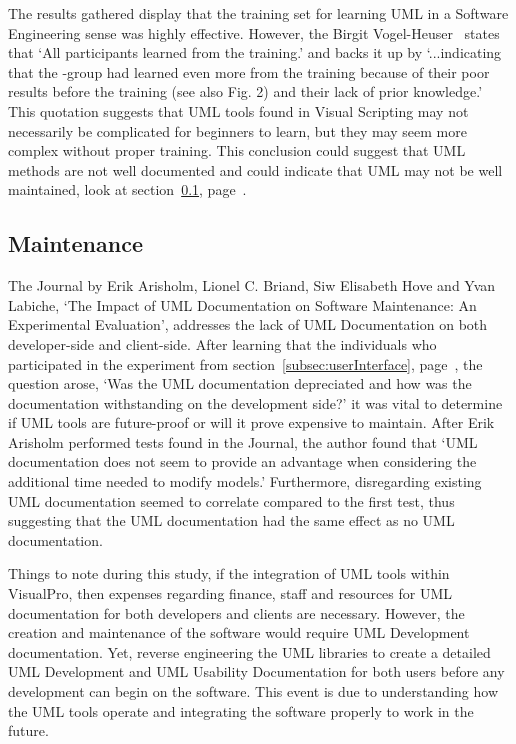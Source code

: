 \documentclass[12pt]{report} %
\begin{document}
			The results gathered display that the training set for learning UML in a Software Engineering sense was highly effective. However, the Birgit Vogel-Heuser~\cite{vogel-heuser_evaluation_2013} states that `All participants learned from the training.' and backs it up by `...indicating that the -group had learned even more from the training because of their poor results before the training (see also Fig. 2) and their lack of prior knowledge.' This quotation suggests that UML tools found in Visual Scripting may not necessarily be complicated for beginners to learn, but they may seem more complex without proper training. This conclusion could suggest that UML methods are not well documented and could indicate that UML may not be well maintained, look at section~\ref{subsec:maintenance}, page~\pageref{subsec:maintenance}.

		\subsection{Maintenance}
		\label{subsec:maintenance}
			The Journal by Erik Arisholm, Lionel C. Briand, Siw Elisabeth Hove and Yvan Labiche, `The Impact of UML Documentation on Software Maintenance: An Experimental Evaluation', addresses the lack of UML Documentation on both developer-side and client-side. After learning that the individuals who participated in the experiment from section~\ref{subsec:userInterface}, page~\pageref{subsec:userInterface}, the question arose, `Was the UML documentation depreciated and how was the documentation withstanding on the development side?' it was vital to determine if UML tools are future-proof or will it prove expensive to maintain. After Erik Arisholm performed tests found in the Journal, the author found that `UML documentation does not seem to provide an advantage when considering the additional time needed to modify models.' Furthermore, disregarding existing UML documentation seemed to correlate compared to the first test, thus suggesting that the UML documentation had the same effect as no UML documentation.

			Things to note during this study, if the integration of UML tools within VisualPro, then expenses regarding finance, staff and resources for UML documentation for both developers and clients are necessary. However, the creation and maintenance of the software would require UML Development documentation. Yet, reverse engineering the UML libraries to create a detailed UML Development and UML Usability Documentation for both users before any development can begin on the software. This event is due to understanding how the UML tools operate and integrating the software properly to work in the future.
\end{document}
